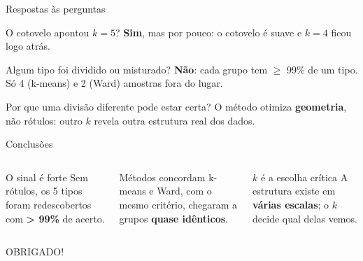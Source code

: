 \documentclass[aspectratio=169,10pt,xcolor=table]{beamer}
\begin{document}
\begin{frame}{Respostas às perguntas}
  \vspace{0.25cm}
  \begin{card}[fontupper=\normalsize]{O cotovelo apontou $k = 5$?}
    \textbf{Sim}, mas por pouco: o cotovelo é suave e $k=4$ ficou logo atrás.
  \end{card}
  \begin{card}[fontupper=\normalsize]{Algum tipo foi dividido ou misturado?}
    \textbf{Não}: cada grupo tem $\geq$ 99\% de um tipo. Só 4 (k-means) e 2 (Ward) amostras fora do lugar.
  \end{card}
  \begin{card}[fontupper=\normalsize]{Por que uma divisão diferente pode estar certa?}
    O método otimiza \textbf{geometria}, não rótulos: outro $k$ revela outra estrutura real dos dados.
  \end{card}
\end{frame}

\begin{frame}{Conclusões}
  \vspace{0.3cm}
  \begin{columns}[T,onlytextwidth]
    \begin{card}[height=2.9cm,fontupper=\normalsize]{O sinal é forte}
      Sem rótulos, os 5 tipos foram redescobertos com \textbf{> 99\%} de acerto.
    \end{card}
    \begin{card}[height=2.9cm,fontupper=\normalsize]{Métodos concordam}
      k-means e Ward, com o mesmo critério, chegaram a grupos \textbf{quase idênticos}.
    \end{card}
    \begin{card}[height=2.9cm,fontupper=\normalsize,colbacktitle=accent]{$k$ é a escolha crítica}
      A estrutura existe em \textbf{várias escalas}; o $k$ decide qual delas vemos.
    \end{card}
  \end{columns}
  \vspace{0.5cm}
  \centering
  {\titlefont\fontsize{26}{28}\selectfont\color{titlecol}OBRIGADO!\par}
\end{frame}
\end{document}
